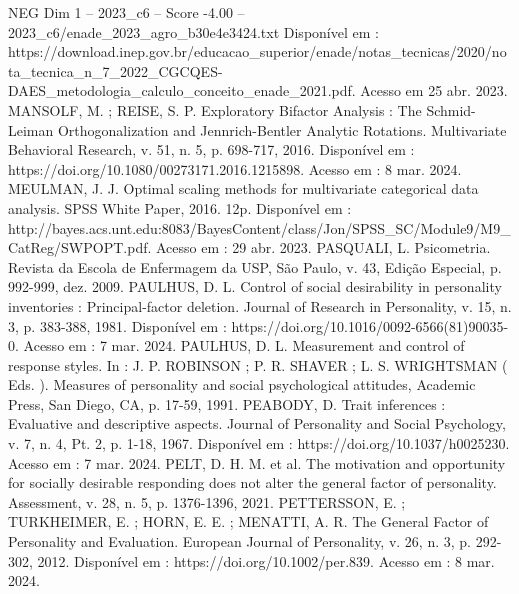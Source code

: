 \begin{textsample}{NEG Dim 1 – 2023\_c6 – Score -4.00 – 2023\_c6/enade\_2023\_agro\_b30e4e3424.txt}
Disponível em : https://download.inep.gov.br/educacao\_superior/enade/notas\_tecnicas/2020/nota\_tecnica\_n\_7\_2022\_CGCQES-DAES\_metodologia\_calculo\_conceito\_enade\_2021.pdf.
Acesso em 25 abr. 2023.
MANSOLF, M. ; REISE, S.
P.
Exploratory Bifactor Analysis : The Schmid-Leiman Orthogonalization and Jennrich-Bentler Analytic Rotations.
Multivariate Behavioral Research, v. 51, n. 5, p. 698-717, 2016.
Disponível em : https://doi.org/10.1080/00273171.2016.1215898.
Acesso em : 8 mar. 2024.
MEULMAN, J.
J.
Optimal scaling methods for multivariate categorical data analysis.
SPSS White Paper, 2016. 12p.
Disponível em : http://bayes.acs.unt.edu:8083/BayesContent/class/Jon/SPSS\_SC/Module9/M9\_CatReg/SWPOPT.pdf.
Acesso em : 29 abr. 2023.
PASQUALI, L.
Psicometria.
Revista da Escola de Enfermagem da USP, São Paulo, v. 43, Edição Especial, p. 992-999, dez. 2009.
PAULHUS, D.
L.
Control of social desirability in personality inventories : Principal-factor deletion.
Journal of Research in Personality, v. 15, n. 3, p. 383-388, 1981.
Disponível em : https://doi.org/10.1016/0092-6566(81)90035-0.
Acesso em : 7 mar. 2024.
PAULHUS, D.
L.
Measurement and control of response styles.
In : J.
P.
ROBINSON ; P.
R.
SHAVER ; L.
S.
WRIGHTSMAN ( Eds. ).
Measures of personality and social psychological attitudes, Academic Press, San Diego, CA, p. 17-59, 1991.
PEABODY, D.
Trait inferences : Evaluative and descriptive aspects.
Journal of Personality and Social Psychology, v. 7, n. 4, Pt. 2, p. 1-18, 1967.
Disponível em : https://doi.org/10.1037/h0025230.
Acesso em : 7 mar. 2024.
PELT, D.
H.
M. et al.
The motivation and opportunity for socially desirable responding does not alter the general factor of personality.
Assessment, v. 28, n. 5, p. 1376-1396, 2021.
PETTERSSON, E. ; TURKHEIMER, E. ; HORN, E.
E. ; MENATTI, A.
R.
The General Factor of Personality and Evaluation.
European Journal of Personality, v. 26, n. 3, p. 292-302, 2012.
Disponível em : https://doi.org/10.1002/per.839.
Acesso em : 8 mar. 2024.

\end{textsample}
